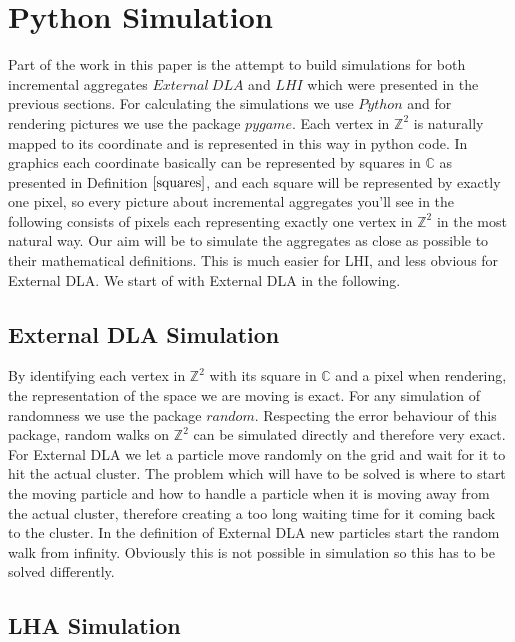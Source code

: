 \documentclass[12pt,a4paper]{scrartcl}
\numberwithin{equation}{subsection}
\newcommand{\C}{\mathbb{C}} %
\newcommand{\Z}{\mathbb{Z}} %
\newcommand{\1}{\mathbbm{1}}
\numberwithin{equation}{section}
\theoremstyle{definition}
\begin{document}
\newpage
\section{Python Simulation}
Part of the work in this paper is the attempt to build simulations for both incremental aggregates $\mathit{External\ DLA}$ and $\mathit{LHI}$ which were presented in the previous sections. For calculating the simulations we use $\mathit{Python}$ and for rendering pictures we use the package $\mathit{pygame}$. Each vertex in $\Z^2$ is naturally mapped to its coordinate and is represented in this way in python code. In graphics each coordinate basically can be represented by squares in $\C$ as presented in Definition $\ref{squares}$, and each square will be represented by exactly one pixel, so every picture about incremental aggregates you'll see in the following consists of pixels each representing exactly one vertex in $\Z^2$ in the most natural way. Our aim will be to simulate the aggregates as close as possible to their mathematical definitions. This is much easier for LHI, and less obvious for External DLA. We start of with External DLA in the following.

\subsection{External DLA Simulation}

By identifying each vertex in $\Z^2$ with its square in $\C$ and a pixel when rendering, the representation of the space we are moving is exact. For any simulation of randomness we use the package $\mathit{random}$. Respecting the error behaviour of this package, random walks on $\Z^2$ can be simulated directly and therefore very exact. For External DLA we let a particle move randomly on the grid and wait for it to hit the actual cluster. The problem which will have to be solved is where to start the moving particle and how to handle a particle when it is moving away from the actual cluster, therefore creating a too long waiting time for it coming back to the cluster. In the definition of External DLA new particles start the random walk from infinity. Obviously this is not possible in simulation so this has to be solved differently. 



\subsection{LHA Simulation}
\end{document}
